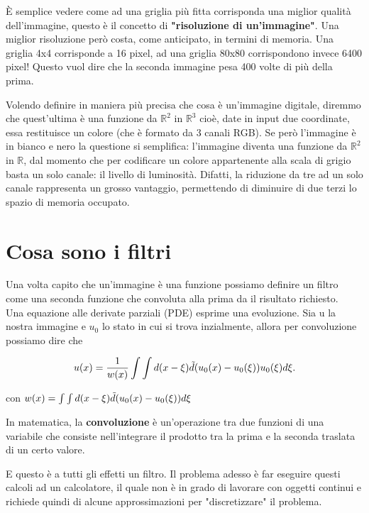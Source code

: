 \noindent
\`E semplice vedere come ad una griglia più fitta corrisponda una miglior qualità dell'immagine, questo è il concetto di \textbf{"risoluzione di un'immagine"}. 
Una miglior risoluzione però costa, come anticipato, in termini di memoria. Una griglia 4x4 corrisponde a 16 pixel, ad una griglia 80x80 corrispondono invece 6400 pixel! Questo vuol dire che la seconda immagine pesa 400 volte di più della prima.

\vspace{1em} \noindent
Volendo definire in maniera più precisa che cosa è un'immagine digitale, diremmo che quest'ultima è una funzione da $\mathbb R^2$ in $\mathbb R^3$ cioè, date in input due coordinate, essa restituisce un colore (che è formato da 3 canali RGB). Se però l'immagine è in bianco e nero la questione si semplifica: l'immagine diventa una funzione da $\mathbb R^2$ in $\mathbb R$, dal momento che per codificare un colore appartenente alla scala di grigio basta un solo canale: il livello di luminosità. Difatti, la riduzione da tre ad un solo canale rappresenta un grosso vantaggio, permettendo di diminuire di due terzi lo spazio di memoria occupato.

\section{Cosa sono i filtri}
Una volta capito che un'immagine è una funzione possiamo definire un filtro come una seconda funzione che convoluta alla prima da il risultato richiesto.\\
Una equazione alle derivate parziali (PDE) esprime una evoluzione. Sia u la nostra immagine e $u_0$ lo stato in cui si trova inzialmente, allora per convoluzione possiamo dire che 

\begin{equation} \label{eq:eq3}
u(x)=\frac{1}{w(x)}\int\int d(x-\xi)\Tilde{d}(u_0(x) -u_0(\xi))u_0(\xi)d\xi.
\end{equation}

\centering con  $w(x) = \int\int d(x-\xi)\Tilde{d}(u_0(x) -u_0(\xi))d\xi$\newline

\raggedright

In matematica, la \textbf{convoluzione} è un'operazione tra due funzioni di una variabile che consiste nell'integrare il prodotto tra la prima e la seconda traslata di un certo valore.

E questo è a tutti gli effetti un filtro. Il problema adesso è far eseguire questi calcoli ad un calcolatore, il quale non è in grado di lavorare con oggetti continui e richiede quindi di alcune approssimazioni per "discretizzare" il problema.


